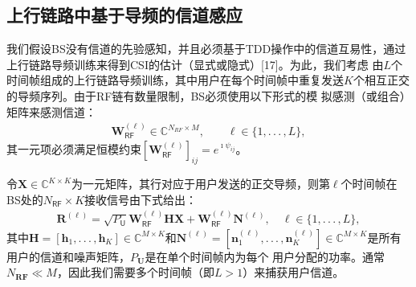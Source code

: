 \documentclass[10pt,journal,final]{IEEEtran}%
\begin{document}
\subsection{上行链路中基于导频的信道感应}
\vspace{0.2em}
我们假设BS没有信道的先验感知，并且必须基于TDD操作中的信道互易性，通过上行链路导频训练来得到CSI的估计（显式或隐式）[17]。为此，我们考虑
由$L$个时间帧组成的上行链路导频训练，其中用户在每个时间帧中重复发送$K$个相互正交的导频序列。由于RF链有数量限制，BS必须使用以下形式的模
拟感测（或组合）矩阵来感测信道：
\begin{align}
\mathbf{W}_{\mathsf{R}\mathsf{F}}^{(\ell)}\in \mathbb{C} ^{N_{RF}\times M},\qquad \ell \in \{1,.\,.\,.\, ,L \},
\end{align}
其一元项必须满足恒模约束$[\mathbf{W}_{\mathsf{R}\mathsf{F}}^{(\ell)}]_{ij}=e^{\imath \psi_{ij}}$。

令$\mathbf{X} \in \mathbb{C} ^{K \times K}$为一元矩阵，其行对应于用户发送的正交导频，则第$\ell $个时间帧在BS处的$N_{\mathsf{R} \mathsf{F} }
\times K$接收信号由下式给出：
\begin{align}
\mathbf{R}^{(\ell)}=\sqrt{P_{\mathsf{U}}}\mathbf{W}_{\mathsf{R}\mathsf{F}}^{(\ell)}\mathbf{H}\mathbf{X} +\mathbf{W}_{\mathsf{R}\mathsf{F}}^{(\ell)}
\mathbf{N}^{(\ell)},\quad \ell \in \{1,.\,.\,.\, ,L\},
\end{align}
其中$\mathbf{H}=[\mathbf{h}_{1},.\,.\,.\, ,\mathbf{h}_{K}]\in \mathbb{C}^{M \times K}$和$\mathbf{N}^{(\ell)}=[\mathbf{n}_{1}^{(\ell)}
,.\,.\,.\, ,\mathbf{n}_{K}^{(\ell)}] \in \mathbb{C}^{M \times K}$是所有用户的信道和噪声矩阵，$P_{\mathbf{U}}$是在单个时间帧内为每个
用户分配的功率。通常$N_{\mathbf{R}\mathbf{F}}\ll M$，因此我们需要多个时间帧（即$L>1$）来捕获用户信道。
\end{document}
